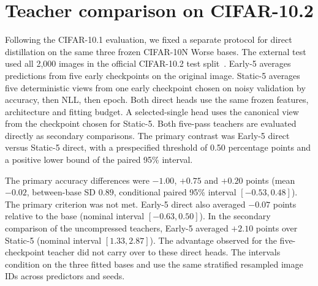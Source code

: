 \section{Teacher comparison on CIFAR-10.2}
\label{sec:teacher-cifar102}
Following the CIFAR-10.1 evaluation, we fixed a separate protocol for
direct distillation on the same three frozen CIFAR-10N Worse bases.
The external test used all 2,000 images in the official CIFAR-10.2
test split~\citep{lu2020harder}. Early-5 averages predictions from five
early checkpoints on the original image. Static-5 averages five
deterministic views from one early checkpoint chosen on noisy validation
by accuracy, then NLL, then epoch. Both direct heads use the same frozen
features, architecture and fitting budget. A selected-single head uses the
canonical view from the checkpoint chosen for Static-5. Both five-pass
teachers are evaluated directly as secondary comparisons. The primary
contrast was Early-5 direct versus Static-5 direct, with a prespecified
threshold of 0.50 percentage points and a positive lower bound of the
paired 95\% interval.

\begin{table}[tb]
\centering
\small
\caption{CIFAR-10.2 test accuracy (\%) across the three frozen bases.
The first four predictors use one backbone pass. The last two use five.}
\label{tab:teacher-cifar102}

\end{table}

The primary accuracy differences were $-1.00$, $+0.75$ and $+0.20$
points (mean $-0.02$, between-base SD $0.89$, conditional paired
95\% interval $[-0.53, 0.48]$). The primary criterion was not met.
Early-5 direct also averaged $-0.07$ points relative to the base
(nominal interval $[-0.63, 0.50]$). In the secondary comparison of the
uncompressed teachers, Early-5 averaged $+2.10$ points over Static-5
(nominal interval $[1.33, 2.87]$). The advantage observed for the
five-checkpoint teacher did not carry over to these direct heads.
The intervals condition on the three fitted bases and use the same
stratified resampled image IDs across predictors and seeds.
